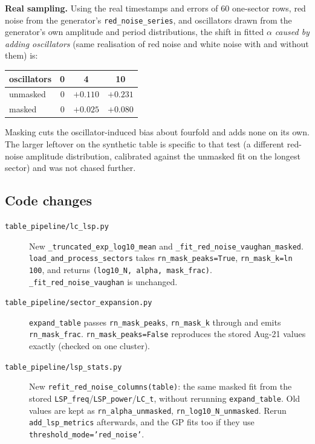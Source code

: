 \documentclass[11pt]{article}
\newcommand{\code}[1]{\texttt{#1}}
\begin{document}
\textbf{Real sampling.} Using the real timestamps and errors of 60 one-sector rows, red
noise from the generator's \code{red\_noise\_series}, and oscillators drawn from the
generator's own amplitude and period distributions, the shift in fitted $\alpha$
\emph{caused by adding oscillators} (same realisation of red noise and white noise with
and without them) is:

\begin{center}
\begin{tabular}{lccc}
\toprule
oscillators & 0 & 4 & 10 \\
\midrule
unmasked & 0 & $+0.110$ & $+0.231$ \\
masked   & 0 & $+0.025$ & $+0.080$ \\
\bottomrule
\end{tabular}
\end{center}

Masking cuts the oscillator-induced bias about fourfold and adds none on its own. The
larger leftover on the synthetic table is specific to that test (a different red-noise
amplitude distribution, calibrated against the unmasked fit on the longest sector) and was
not chased further.

\subsection{Code changes}

\begin{description}
\item[\code{table\_pipeline/lc\_lsp.py}]
  New \code{\_truncated\_exp\_log10\_mean} and \code{\_fit\_red\_noise\_vaughan\_masked}.
  \code{load\_and\_process\_sectors} takes \code{rn\_mask\_peaks=True},
  \code{rn\_mask\_k=ln 100}, and returns \code{(log10\_N, alpha, mask\_frac)}.
  \code{\_fit\_red\_noise\_vaughan} is unchanged.
\item[\code{table\_pipeline/sector\_expansion.py}]
  \code{expand\_table} passes \code{rn\_mask\_peaks}, \code{rn\_mask\_k} through and emits
  \code{rn\_mask\_frac}. \code{rn\_mask\_peaks=False} reproduces the stored Aug-21 values
  exactly (checked on one cluster).
\item[\code{table\_pipeline/lsp\_stats.py}]
  New \code{refit\_red\_noise\_columns(table)}: the same masked fit from the stored
  \code{LSP\_freq}/\code{LSP\_power}/\code{LC\_t}, without rerunning
  \code{expand\_table}. Old values are kept as \code{rn\_alpha\_unmasked},
  \code{rn\_log10\_N\_unmasked}. Rerun \code{add\_lsp\_metrics} afterwards, and the GP
  fits too if they use \code{threshold\_mode='red\_noise'}.
\end{description}
\end{document}
